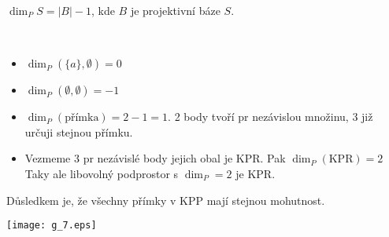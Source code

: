 \begin{definition}[Dimenze]
    $\dim_P S=|B|-1$, kde $B$ je projektivní báze $S$.
\end{definition}

\begin{note}[O dimenzi]~
    \begin{itemize}
        \item $\dim_P(\{a\},\emptyset)=0$
        \item $\dim_P(\emptyset, \emptyset)=-1$
        \item $\dim_P(\text{přímka})=2-1=1$.
		2 body tvoří pr nezávislou množinu, 3 již určuji stejnou přímku.
        \item Vezmeme 3 pr nezávislé body jejich obal je KPR. Pak $\dim_P(\text{KPR})=2$
		Taky ale libovolný podprostor s $\dim_P = 2$ je KPR.
    \end{itemize}

    Důsledkem je, že všechny přímky v KPP mají stejnou mohutnost.

    \texttt{[image: g\_7.eps]}
\end{note}

